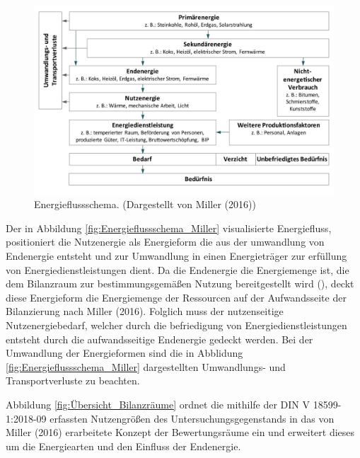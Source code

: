 \begin{figure}[H]
    \centering
    \includegraphics[width=1\textwidth]{../../Ressourcen/Abbildungen/Energiefluss_Miller.jpg}
    \caption{Energieflussschema. (Dargestellt von Miller (2016))}
    \label{fig:Energieflussschema_Miller}
\end{figure}

Der in Abbildung \eqref{fig:Energieflussschema_Miller} visualisierte Energiefluss, positioniert die Nutzenergie als Energieform die aus der umwandlung von Endenergie entsteht 
und zur Umwandlung in einen Energieträger zur erfüllung von Energiedienstleistungen dient.
Da die Endenergie die Energiemenge ist, die dem Bilanzraum zur bestimmungsgemäßen Nutzung bereitgestellt wird (\cite[Kapitel 3.1.2]{DIN18599.2018}), 
deckt diese Energieform die Energiemenge der Ressourcen auf der Aufwandsseite der Bilanzierung nach Miller (2016).
Folglich muss der nutzenseitige Nutzenergiebedarf, welcher durch die befriedigung von Energiedienstleistungen entsteht durch die aufwandsseitige Endenergie gedeckt werden.
Bei der Umwandlung der Energieformen sind die in Abblidung \eqref{fig:Energieflussschema_Miller} dargestellten Umwandlungs- und Transportverluste zu beachten.


Abbildung \eqref{fig:Übersicht_Bilanzräume} ordnet die mithilfe der DIN V 18599-1:2018-09 erfassten Nutzengrößen des Untersuchungsgegenstands in das von 
Miller (2016) erarbeitete Konzept der Bewertungsräume ein und erweitert dieses um die Energiearten und den Einfluss der Endenergie.

